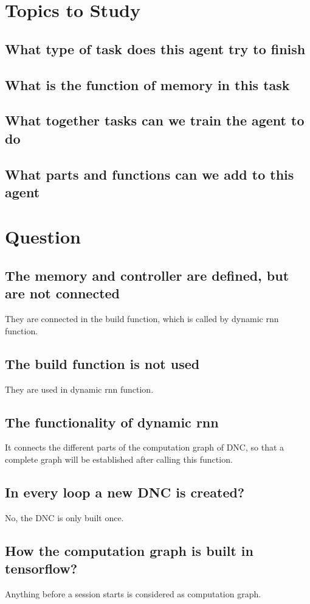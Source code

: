 \documentclass{article}
\begin{document}
\section{Topics to Study}
\subsection{What type of task does this agent try to finish}
\subsection{What is the function of memory in this task}
\subsection{What together tasks can we train the agent to do}
\subsection{What parts and functions can we add to this agent}

\section{Question}
\subsection{The memory and controller are defined, but are not connected}
They are connected in the build function, which is called by dynamic rnn function.
\subsection{The build function is not used}
They are used in dynamic rnn function.
\subsection{The functionality of dynamic rnn}
It connects the different parts of the computation graph of DNC, so that a complete graph will be established after calling this function.
\subsection{In every loop a new DNC is created?}
No, the DNC is only built once. 
\subsection{How the computation graph is built in tensorflow?}
Anything before a session starts is considered as computation graph.
\end{document}

